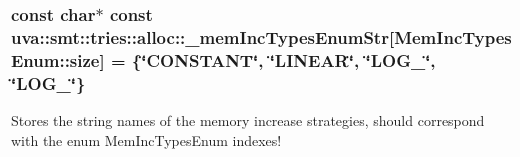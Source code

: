 \subsubsection[{\+\_\+mem\+Inc\+Types\+Enum\+Str}]{\setlength{\rightskip}{0pt plus 5cm}const char$\ast$ const uva\+::smt\+::tries\+::alloc\+::\+\_\+mem\+Inc\+Types\+Enum\+Str\mbox{[}Mem\+Inc\+Types\+Enum\+::size\mbox{]} = \{\char`\"{}C\+O\+N\+S\+T\+A\+N\+T\char`\"{}, \char`\"{}{\bf L\+I\+N\+E\+A\+R}\char`\"{}, \char`\"{}{\bf L\+O\+G\+\_}\char`\"{}, \char`\"{}{\bf L\+O\+G\+\_}\char`\"{}\}}\label{namespaceuva_1_1smt_1_1tries_1_1alloc_a2ee2b31ccd454a61720cd6c0d7ca260c}
Stores the string names of the memory increase strategies, should correspond with the enum Mem\+Inc\+Types\+Enum indexes! 